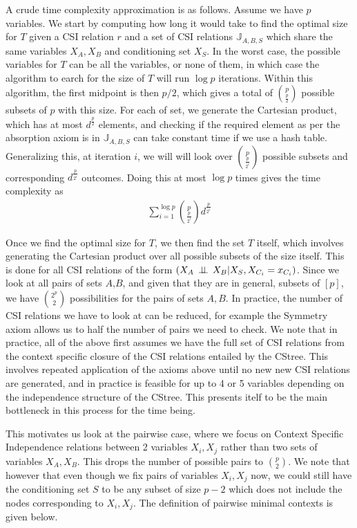 \documentclass{tufte-book}
\begin{document}
A crude time complexity approximation is as follows. Assume we have \(p\) variables. We start by computing how long it would take to find the optimal size for \(T\) given a CSI relation \(r\) and a set of CSI relations \(\mathbb{J}_{A,B,S}\) which share the same variables \(X_A,X_B\) and conditioning set \(X_S\). In the worst case, the possible variables for \(T\) can be all the variables, or none of them, in which case the algorithm to earch for the size of \(T\) will run \(\log p\) iterations. Within this algorithm, the first midpoint is then \(p/2\), which gives a total of \(p\choose \frac{p}{2}\) possible subsets of \(p\) with this size. For each of set, we generate the Cartesian product, which has at most \(d^{\frac{p}{2}}\) elements, and checking if the required element as per the absorption axiom is in \(\mathbb{J}_{A,B,S}\) can take constant time if we use a hash table. Generalizing this, at iteration \(i\), we will will look over \(p \choose \frac{p}{2^i}\) possible subsets and corresponding \(d^{\frac{p}{2^i}}\) outcomes. Doing this at most \(\log p\) times gives the time complexity as
\begin{align*}
\sum_{i=1}^{\log p} {p\choose{\frac{p}{2^i}}}d^{\frac{p}{2^i}}
\end{align*}

Once we find the optimal size for \(T\), we then find the set \(T\) itself, which involves generating the Cartesian product over all possible subsets of the size itself. This is done for all CSI relations of the form \((X_A\,\perp \!\!\! \perp\,X_B|X_S,X_{C_i}=x_{C_i})\). Since we look at all pairs of sets \(A\),\(B\), and given that they are in general, subsets of \([p]\), we have \(2^p \choose 2\) possibilities for the pairs of sets \(A,B\). In practice, the number of CSI relations we have to look at can be reduced, for example the Symmetry axiom allows us to half the number of pairs we need to check. We note that in practice, all of the above first assumes we have the full set of CSI relations from the context specific closure of the CSI relations entailed by the CStree. This involves repeated application of the axioms above until no new new CSI relations are generated, and in practice is feasible for up to 4 or 5 variables depending on the independence structure of the CStree. This presents itelf to be the main bottleneck in this process for the time being.


This motivates us look at the pairwise case, where we focus on Context Specific Independence relations between 2 variables \(X_i,X_j\) rather than two sets of variables \(X_A,X_B\). This drops the number of possible pairs to \(p \choose 2\). We note that however that even though we fix pairs of variables \(X_i,X_j\) now, we could still have the conditioning set \(S\) to be any subset of size \(p-2\) which does not include the nodes corresponding to \(X_i,X_j\). The definition of pairwise minimal contexts is given below.
\end{document}
